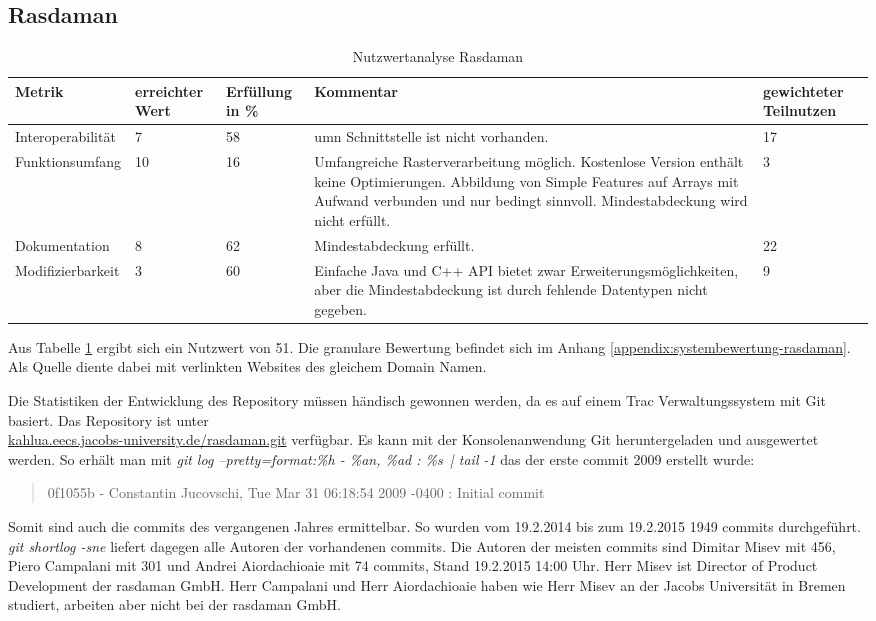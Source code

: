 \subsection{Rasdaman}
\begin{table}[h!]
\centering
\small
\begin{tabular}{|l|p{1.8cm}|l|p{3.1cm}|p{1.8cm}|}
\hline
\textbf{Metrik} & \textbf{erreichter Wert} & \textbf{Erfüllung in \%} & \textbf{Kommentar} & \textbf{gewichteter Teilnutzen} \\ \hline
Interoperabilität & 7 & 58 & \Gls{umn} Schnittstelle ist nicht vorhanden. & 17 \\ \hline
Funktionsumfang & 10 & 16 & Umfangreiche Rasterverarbeitung möglich. Kostenlose Version enthält keine Optimierungen. Abbildung von Simple Features auf Arrays mit Aufwand verbunden und nur bedingt sinnvoll. Mindestabdeckung wird nicht erfüllt. & 3 \\ \hline
Dokumentation & 8 & 62 & Mindestabdeckung erfüllt. & 22 \\ \hline
Modifizierbarkeit & 3 & 60 & Einfache Java und C++ API bietet zwar Erweiterungsmöglichkeiten, aber die Mindestabdeckung ist durch fehlende Datentypen nicht gegeben. & 9 \\ \hline
\end{tabular}
\caption{Nutzwertanalyse Rasdaman}
\label{table:nutzwertanalyse-rasdaman}
\end{table}
Aus Tabelle \ref{table:nutzwertanalyse-rasdaman} ergibt sich ein Nutzwert von 51.
Die granulare Bewertung befindet sich im Anhang \ref{appendix:systembewertung-rasdaman}.
Als Quelle diente dabei \cite{website:rasdaman-features} mit verlinkten Websites des gleichem Domain Namen.

Die Statistiken der Entwicklung des Repository müssen händisch gewonnen werden, da es auf einem Trac Verwaltungssystem mit Git basiert.
Das Repository ist unter\\\url{kahlua.eecs.jacobs-university.de/rasdaman.git} verfügbar.
Es kann mit der Konsolenanwendung Git heruntergeladen und ausgewertet werden.
So erhält man mit \textit{git log --pretty=format:\grqq \%h - \%an, \%ad : \%s\grqq\ | tail -1} das der erste commit 2009 erstellt wurde:
\begin{quote}
0f1055b - Constantin Jucovschi, Tue Mar 31 06:18:54 2009 -0400 : Initial commit
\end{quote}
Somit sind auch die commits des vergangenen Jahres ermittelbar.
So wurden vom 19.2.2014 bis zum 19.2.2015 1949 commits durchgeführt.
\textit{git shortlog -sne} liefert dagegen alle Autoren der vorhandenen commits.
Die Autoren der meisten commits sind Dimitar Misev mit 456, Piero Campalani mit 301 und Andrei Aiordachioaie mit 74 commits, Stand 19.2.2015 14:00 Uhr.
Herr Misev ist %
Director of Product Development der \mbox{rasdaman} GmbH.
Herr Campalani und Herr Aiordachioaie haben wie Herr Misev an der Jacobs Universität in Bremen studiert, arbeiten aber nicht bei der \mbox{rasdaman} GmbH.

